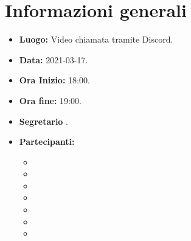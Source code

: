 \section{Informazioni generali}
	\begin{itemize}
		\item \textbf{Luogo:} Video chiamata tramite Discord.
		\item \textbf{Data:} 2021-03-17.
		\item \textbf{Ora Inizio:} 18:00.
		\item \textbf{Ora fine:} 19:00.
		\item \textbf{Segretario} \GB.
		\item \textbf{Partecipanti:}
		\begin{itemize}
			\item \MB
			\item \VAS
			\item \FD
			\item \NM
			\item \SB
			\item \GB
			\item \MDI
		\end{itemize}
		
	\end{itemize}